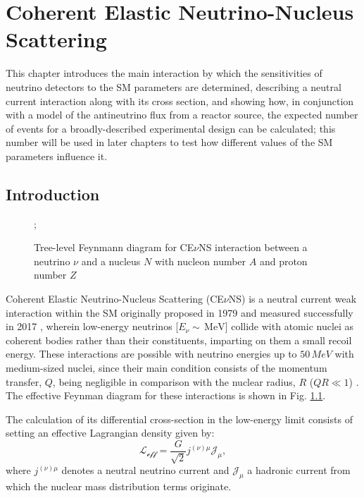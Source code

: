 \chapter{Coherent Elastic Neutrino-Nucleus Scattering}
This chapter introduces the main interaction by which the sensitivities of neutrino detectors to the SM parameters are determined, describing a neutral current interaction along with its cross section, and showing how, in conjunction with a model of the antineutrino flux from a reactor source, the expected number of events for a broadly-described experimental design can be calculated; this number will be used in later chapters to test how different values of the SM parameters influence it.
\section{Introduction}
\begin{figure}
\centering
{};
\caption{Tree-level Feynmann diagram for CE$\nu$NS interaction between a neutrino $\nu$ and a nucleus $N$ with nucleon number $A$ and proton number $Z$}
\label{fig:Feynmann_CEvNS}
\end{figure}
Coherent Elastic Neutrino-Nucleus Scattering (CE$\nu$NS) is a neutral current weak interaction within the SM originally proposed in 1979 \cite{PhysRevD.9.1389} and measured successfully in 2017 \cite{doi:10.1126/science.aao0990}, wherein low-energy neutrinos [$E_{\nu} \sim \, \text{MeV}$] collide with atomic nuclei as coherent bodies rather than their constituents, imparting on them a small recoil energy. These interactions are possible with neutrino energies up to $50\,MeV$ with medium-sized nuclei, since their main condition consists of the momentum transfer, $Q$, being negligible in comparison with the nuclear radius, $R$ ($QR \ll 1$) \cite{Scholberg_2020}. The effective Feynman diagram for these interactions is shown in Fig. \ref{fig:Feynmann_CEvNS}.

The calculation of its differential cross-section in the low-energy limit consists of setting an effective Lagrangian density given by:
\begin{equation}
    \mathcal{L_{\text{eff}}} = \frac{G}{\sqrt{2}}j^{(\nu)\mu} \mathcal{J}_{\mu},
\end{equation}
where $j^{(\nu)\mu}$ denotes a neutral neutrino current and $\mathcal{J}_{\mu}$ a hadronic current from which the nuclear mass distribution terms originate.

